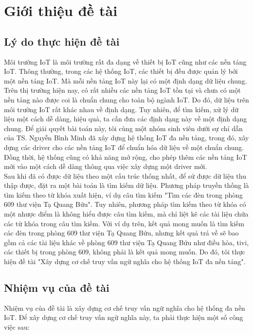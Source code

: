 \chapter{Giới thiệu đề tài}
\section{Lý do thực hiện đề tài}
Môi trường IoT là môi trường rất đa dạng về thiết bị IoT cũng như các nền tảng IoT. Thông thường, trong các hệ thống IoT, các thiết bị đều được quản lý bởi một nền tảng IoT. Mà mỗi nền tảng IoT này lại có một định dạng dữ liệu chung. Trên thị trường hiện nay, có rất nhiều các nền tảng IoT tồn tại và chưa có một nền tảng nào được coi là chuẩn chung cho toàn bộ ngành IoT. Do đó, dữ liệu trên môi trường IoT rất khác nhau về định dạng. Tuy nhiên, để tìm kiếm, xử lý dữ liệu một cách dễ dàng, hiệu quả, ta cần đưa các định dạng này về một định dạng chung. Để giải quyết bài toán này, tôi cùng một nhóm sinh viên dưới sự chỉ dẫn của TS. Nguyễn Bình Minh đã xây dựng hệ thống IoT đa nền tảng, trong đó, xây dựng các driver cho các nền tảng IoT để chuẩn hóa dữ liệu về một chuẩn chung. Đồng thời, hệ thống cũng có khả năng mở rộng, cho phép thêm các nền tảng IoT mới vào một cách dễ dàng thông qua việc xây dựng một driver mới. \\

Sau khi đã có được dữ liệu theo một cấu trúc thống nhất,  để sử được dữ liệu thu thập được,  đặt ra một bài toán là tìm kiếm dữ liệu. Phương pháp truyền thống là tìm kiếm theo từ khóa xuất hiện, ví dụ câu tìm kiếm "Tìm các đèn trong phòng 609 thư viện Tạ Quang Bửu". Tuy nhiên, phương pháp tìm kiếm theo từ khóa có một nhược điểm là không hiểu được câu tìm kiếm, mà chỉ liệt kê các tài liệu chứa các từ khóa trong câu tìm kiếm. Với ví dụ trên, kết quả mong muốn là tìm kiếm các đèn trong phòng 609 thư viện Tạ Quang Bửu, nhưng kết quả trả về sẽ bao gồm cả các tài liệu khác về phòng 609 thư viện Tạ Quang Bửu như điều hòa, tivi, các thiết bị trong phòng 609, không phải là kết quả mong muốn. Do đó, tôi thực hiện đề tài "Xây dựng cơ chế truy vấn ngữ nghĩa cho hệ thống IoT đa nền tảng".\\

\section{Nhiệm vụ của đề tài}
Nhiệm vụ của đề tài là xây dựng cơ chế truy vấn ngữ nghĩa cho hệ thống đa nền IoT. Để xây dựng cơ chế truy vấn ngữ nghĩa này, ta phải thực hiện một số công việc sau:


